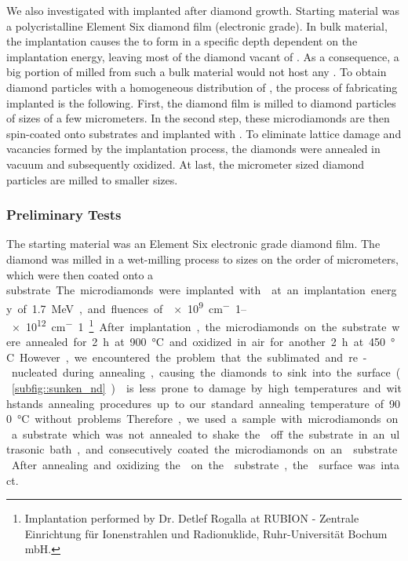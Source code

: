 	We also investigated \nds with \sivs implanted after diamond growth. 
	Starting material was a polycristalline Element Six diamond film (electronic grade).
	In bulk material, the implantation causes the \sivs to form in a specific depth dependent on the implantation energy, leaving most of the diamond vacant of \sivs.
	As a consequence, a big portion of  \nds milled from such a bulk material would not host any \sivs.
	To obtain diamond particles with a homogeneous distribution of \sivs, the process of fabricating implanted \nds is the following. 
	First, the diamond film is milled to diamond particles of sizes of a few micrometers.
	In the second step, these microdiamonds are then spin-coated onto \ir substrates and implanted with .
	To eliminate lattice damage  and vacancies formed by the implantation process, the diamonds were annealed in vacuum and subsequently oxidized.
	At last, the micrometer sized diamond particles are milled to smaller sizes.

	\subsubsection{Preliminary Tests}\label{subsubsec::preliminary_tests}

	The starting material was an Element Six electronic grade diamond film.
	The diamond was milled in a wet-milling process to sizes on the order of micrometers, which were then coated onto a \si substrate.
	The microdiamonds were implanted with  at an implantation energy of \SI{1.7}{MeV}, and fluences of \SIrange{e9}{e12}{cm^-1}\footnote{Implantation performed by Dr. Detlef Rogalla at RUBION - Zentrale Einrichtung f\"ur Ionenstrahlen und Radionuklide, Ruhr-Universit\"at Bochum mbH.}.
	After implantation, the microdiamonds on the \si substrate were annealed for \SI{2}{\hour} at \SI{900}{\celsius} and oxidized in air for another \SI{2}{\hour} at \SI{450}{\celsius}.
	However, we encountered the problem that the \si sublimated and re-nucleated during annealing, causing the diamonds to sink into the \si surface (\autoref{subfig::sunken_nd}).
	\Ir is less prone to damage by high temperatures and withstands annealing procedures up to our standard annealing temperature of \SI{900}{\celsius} without problems.
	Therefore, we used a sample with microdiamonds on a \si substrate which was not annealed to shake the \nds off the \si substrate in an ultrasonic bath, and consecutively coated the microdiamonds on an \ir substrate.
	After annealing and oxidizing the \nds on the \ir substrate, the \ir surface was intact.

